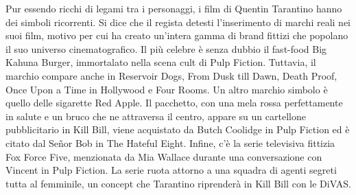 \documentclass[12pt]{article} %
\begin{document}
\begin{flushleft}
Pur essendo ricchi di legami tra i personaggi, i film di Quentin Tarantino hanno dei simboli ricorrenti. Si dice che il regista detesti l’inserimento di marchi reali nei suoi film, motivo per cui ha creato un’intera gamma di brand fittizi che popolano il suo universo cinematografico. Il più celebre è senza dubbio il fast-food Big Kahuna Burger, immortalato nella scena cult di Pulp Fiction. Tuttavia, il marchio compare anche in Reservoir Dogs, From Dusk till Dawn, Death Proof, Once Upon a Time in Hollywood e Four Rooms.
Un altro marchio simbolo è quello delle sigarette Red Apple. Il pacchetto, con una mela rossa perfettamente in salute e un bruco che ne attraversa il centro, appare su un cartellone pubblicitario in Kill Bill, viene acquistato da Butch Coolidge in Pulp Fiction ed è citato dal Señor Bob in The Hateful Eight.
Infine, c’è la serie televisiva fittizia Fox Force Five, menzionata da Mia Wallace durante una conversazione con Vincent in Pulp Fiction. La serie ruota attorno a una squadra di agenti segreti tutta al femminile, un concept che Tarantino riprenderà in Kill Bill con le DiVAS.
\end{flushleft}
\break
\end{document}
